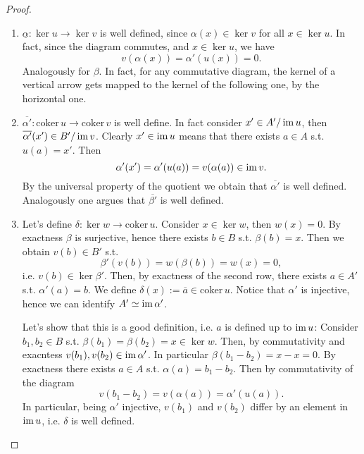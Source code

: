 \documentclass[../Main]{subfiles}
\begin{document}
\begin{proof}\leavevmode\vspace{-.2\baselineskip}
	\begin{enumerate}
		\item $\underline{\alpha}\colon \ker u \to \ker v$ is well defined,
			since $\alpha(x) \in \ker v$ for all $x \in \ker u$.
			In fact, since the diagram commutes, and $x \in \ker u$, we have
			\begin{equation}
				v \left( \alpha(x) \right) = \alpha' (u(x)) = 0
			.\end{equation} 
			Analogously for $\beta$. In fact, for any commutative diagram, the kernel
			of a vertical arrow gets mapped to the kernel of the following one, by the horizontal one.

		\item $\overline{\alpha'}\colon \mathrm{coker}\, u \to \mathrm{coker}\, v$ is well define.
			In fact consider $x' \in A'/\operatorname{im} u$, then $\overline{\alpha'}(x') \in B'/\operatorname{im} v$.
			Clearly $x' \in \operatorname{im} u$ means that there exists $a \in A$ s.t. $u(a) = x'$.
			Then
			\begin{equation}
				\alpha'(x') = \alpha'(u(a)) = v(\alpha(a)) \in \operatorname{im} v
			.\end{equation} 
			By the universal property of the quotient we obtain that $\overline{\alpha'}$ is well defined.
			Analogously one argues that $\overline{\beta'}$ is well defined.

		\item Let's define $\delta\colon \ker w \to \mathrm{coker}\, u$.
			Consider $x \in \ker w$, then $w(x) = 0$.
			By exactness $\beta$ is surjective, hence there exists $b \in B$
			s.t. $\beta(b) = x$.
			Then we obtain $v(b) \in B'$ s.t. 
			\begin{equation}
			\beta'(v(b)) = w(\beta(b)) = w(x) = 0
			,\end{equation} 
			i.e. $v(b) \in \ker \beta'$.
			Then, by exactness of the second row, there exists $a \in A'$
			s.t. $\alpha'(a) = b$.
			We define $\delta(x) := \overline{a} \in \mathrm{coker}\, u$.
			Notice that $\alpha'$ is injective, hence we can identify $A' \simeq \operatorname{im} \alpha'$.

			Let's show that this is a good definition, i.e. $a$ is defined up to $\operatorname{im} u$:
			Consider $b_1, b_2 \in B$ s.t. $\beta(b_1) = \beta(b_2) = x \in \ker w$.
			Then, by commutativity and exacntess $v(b_1), v(b_2) \in \operatorname{im} \alpha'$.
			In particular $\beta(b_1 - b_2) = x - x = 0$.
			By exactness there exists $a \in A$ s.t. $\alpha(a) = b_1 - b_2$.
			Then by commutativity of the diagram
			\begin{equation}
				v(b_1 - b_2) = v ( \alpha(a)) = \alpha'(u(a))
			.\end{equation} 
			In particular, being $\alpha'$ injective, $v(b_1)$ and
			$v(b_2)$ differ by an element in $\operatorname{im} u$, i.e. $\delta$ is well defined.


\end{enumerate}
\end{proof}
\end{document}
